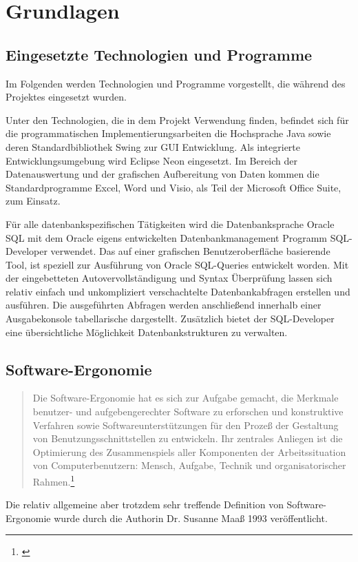 \section{Grundlagen}


\subsection{Eingesetzte Technologien und Programme}
Im Folgenden werden Technologien und Programme vorgestellt, die während des Projektes eingesetzt wurden.

Unter den Technologien, die in dem Projekt Verwendung finden, befindet sich für die programmatischen Implementierungsarbeiten die Hochsprache Java sowie deren Standardbibliothek Swing zur GUI Entwicklung. Als integrierte Entwicklungsumgebung wird Eclipse Neon eingesetzt. Im Bereich der Datenauswertung und der grafischen Aufbereitung von Daten kommen die Standardprogramme Excel, Word und Visio, als Teil der Microsoft Office Suite, zum Einsatz. 

Für alle datenbankspezifischen Tätigkeiten wird die Datenbanksprache Oracle SQL mit dem Oracle eigens entwickelten Datenbankmanagement Programm SQL-Developer verwendet. Das auf einer grafischen Benutzeroberfläche basierende Tool, ist speziell zur Ausführung von Oracle SQL-Queries entwickelt worden. Mit der eingebetteten Autovervollständigung und Syntax Überprüfung lassen sich relativ einfach und unkompliziert verschachtelte Datenbankabfragen erstellen und ausführen. Die ausgeführten Abfragen werden anschließend innerhalb einer Ausgabekonsole tabellarische dargestellt. Zusätzlich bietet der SQL-Developer eine übersichtliche Möglichkeit Datenbankstrukturen zu verwalten. 


\subsection{Software-Ergonomie}
\begin{quote}
    Die Software-Ergonomie hat es sich zur Aufgabe gemacht, die Merkmale benutzer- und aufgebengerechter Software zu erforschen und konstruktive Verfahren sowie Softwareunterstützungen für den Prozeß der Gestaltung von Benutzungsschnittstellen zu entwickeln. Ihr zentrales Anliegen ist die Optimierung des Zusammenspiels aller Komponenten der Arbeitssituation von Computerbenutzern: Mensch, Aufgabe, Technik und organisatorischer Rahmen.\footnote{\cite{Maass1993}}
  \end{quote}
Die relativ allgemeine aber trotzdem sehr treffende Definition von Software-Ergonomie wurde durch die Authorin Dr. Susanne Maaß 1993 veröffentlicht.

